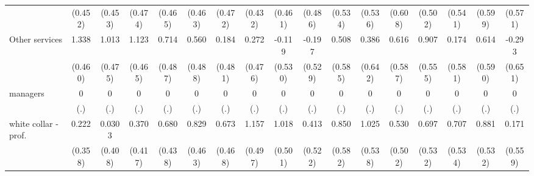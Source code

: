 {\begin{tabular}{l*{16}{c}}
                    &     (0.452)         &     (0.453)         &     (0.474)         &     (0.465)         &     (0.463)         &     (0.472)         &     (0.432)         &     (0.461)         &     (0.486)         &     (0.534)         &     (0.536)         &     (0.608)         &     (0.502)         &     (0.541)         &     (0.599)         &     (0.571)         \\
[1em]
Other services      &       1.338\sym{**} &       1.013\sym{*}  &       1.123\sym{*}  &       0.714         &       0.560         &       0.184         &       0.272         &      -0.119         &      -0.197         &       0.508         &       0.386         &       0.616         &       0.907         &       0.174         &       0.614         &      -0.293         \\
                    &     (0.460)         &     (0.475)         &     (0.465)         &     (0.487)         &     (0.488)         &     (0.481)         &     (0.476)         &     (0.530)         &     (0.529)         &     (0.585)         &     (0.642)         &     (0.587)         &     (0.555)         &     (0.581)         &     (0.590)         &     (0.651)         \\
[1em]
managers            &           0         &           0         &           0         &           0         &           0         &           0         &           0         &           0         &           0         &           0         &           0         &           0         &           0         &           0         &           0         &           0         \\
                    &         (.)         &         (.)         &         (.)         &         (.)         &         (.)         &         (.)         &         (.)         &         (.)         &         (.)         &         (.)         &         (.)         &         (.)         &         (.)         &         (.)         &         (.)         &         (.)         \\
[1em]
white collar - prof.&       0.222         &      0.0303         &       0.370         &       0.680         &       0.829         &       0.673         &       1.157\sym{*}  &       1.018\sym{*}  &       0.413         &       0.850         &       1.025         &       0.530         &       0.697         &       0.707         &       0.881         &       0.171         \\
                    &     (0.358)         &     (0.408)         &     (0.417)         &     (0.438)         &     (0.463)         &     (0.468)         &     (0.497)         &     (0.501)         &     (0.522)         &     (0.582)         &     (0.538)         &     (0.502)         &     (0.532)         &     (0.534)         &     (0.532)         &     (0.559)         \\

\end{tabular}}
